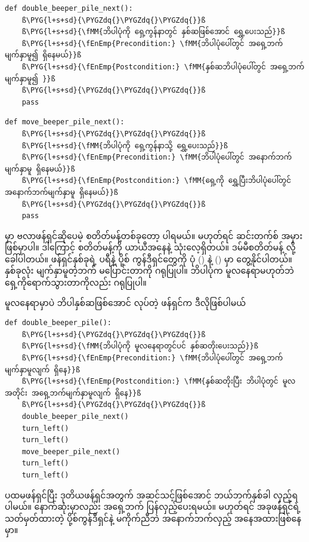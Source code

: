 %
\setlength{\fboxsep}{0pt}
\begin{verbatim}
def double_beeper_pile_next():
    ß\PYG{l+s+sd}{\PYGZdq{}\PYGZdq{}\PYGZdq{}}ß
    ß\PYG{l+s+sd}{\fMM{ဘိပါပုံကို ရှေ့ကွန်နာတွင် နှစ်ဆဖြစ်အောင် ရွှေ့ပေးသည်}}ß
    ß\PYG{l+s+sd}{\fEnEmp{Precondition:} \fMM{ဘိပါပုံပေါ်တွင် အရှေ့ဘက် မျက်နှာမူ၍ ရှိနေမယ်}}ß
    ß\PYG{l+s+sd}{\fEnEmp{Postcondition:} \fMM{နှစ်ဆဘိပါပုံပေါ်တွင် အရှေ့ဘက် မျက်နှာမူ၍ }}ß
    ß\PYG{l+s+sd}{\PYGZdq{}\PYGZdq{}\PYGZdq{}}ß
    pass
\end{verbatim}
%
\betweenminted{\medskipamount}
%
\setlength{\fboxsep}{0pt}
\begin{verbatim}
def move_beeper_pile_next():
    ß\PYG{l+s+sd}{\PYGZdq{}\PYGZdq{}\PYGZdq{}}ß
    ß\PYG{l+s+sd}{\fMM{ဘိပါပုံကို ရှေ့ကွန်နာသို့ ရွှေ့ပေးသည်}}ß
    ß\PYG{l+s+sd}{\fEnEmp{Precondition:} \fMM{ဘိပါပုံပေါ်တွင် အနောက်ဘက်မျက်နှာမူ ရှိနေမယ်}}ß
    ß\PYG{l+s+sd}{\fEnEmp{Postcondition:} \fMM{ရှေ့ကို ရွှေ့ပြီးဘိပါပုံပေါ်တွင် အနောက်ဘက်မျက်နှာမူ ရှိနေမယ်}}ß
    ß\PYG{l+s+sd}{\PYGZdq{}\PYGZdq{}\PYGZdq{}}ß
    pass
\end{verbatim}
%
 မှာ ဗလာဖန်ရှင်ဆိုပေမဲ့ စတိတ်မန့်တစ်ခုတော့ ပါရမယ်။ မဟုတ်ရင် ဆင်းတက်စ် အမှားဖြစ်မှာပါ။ ဒါကြောင့်  စတိတ်မန့်ကို ယာယီအနေနဲ့ သုံးလေ့ရှိတယ်။ ဒမ်မီစတိတ်မန့်   လို့ ခေါ်ပါတယ်။ ဖန်ရှင်နှစ်ခုရဲ့ ပရီနဲ့ ပို့စ် ကွန်ဒီရှင်တွေကို ပုံ (\fRefNo{\ref{fig:dbpnxt12}}) နဲ့ (\fRefNo{\ref{fig:mbpnxt12}}) မှာ တွေ့နိုင်ပါတယ်။ နှစ်ခုလုံး မျက်နှာမူတဲ့ဘက် မပြောင်းတာကို ဂရုပြုပါ။ ဘိပါပုံက မူလနေရာမဟုတ်ဘဲ ရှေ့ကိုရောက်သွားတာကိုလည်း ဂရုပြုပါ။

မူလနေရာမှာပဲ ဘိပါနှစ်ဆဖြစ်အောင် လုပ်တဲ့ ဖန်ရှင်က ဒီလိုဖြစ်ပါမယ်
%
\setlength{\fboxsep}{0pt}
\begin{verbatim}
def double_beeper_pile():
    ß\PYG{l+s+sd}{\PYGZdq{}\PYGZdq{}\PYGZdq{}}ß
    ß\PYG{l+s+sd}{\fMM{ဘိပါပုံကို မူလနေရာတွင်ပင် နှစ်ဆတိုးပေးသည်}}ß
    ß\PYG{l+s+sd}{\fEnEmp{Precondition:} \fMM{ဘိပါပုံပေါ်တွင် အရှေ့ဘက်မျက်နှာမူလျက် ရှိနေ}}ß
    ß\PYG{l+s+sd}{\fEnEmp{Postcondition:} \fMM{နှစ်ဆတိုးပြီး ဘိပါပုံတွင် မူလအတိုင်း အရှေ့ဘက်မျက်နှာမူလျက် ရှိနေ}}ß
    ß\PYG{l+s+sd}{\PYGZdq{}\PYGZdq{}\PYGZdq{}}ß
    double_beeper_pile_next()
    turn_left()
    turn_left()
    move_beeper_pile_next()
    turn_left()
    turn_left()
\end{verbatim}
%
ပထမဖန်ရှင်ပြီး ဒုတိယဖန်ရှင်အတွက် အဆင်သင့်ဖြစ်အောင် ဘယ်ဘက်နှစ်ခါ လှည့်ရပါမယ်။ နောက်ဆုံးမှာလည်း အရှေ့ဘက် ပြန်လှည့်ပေးရမယ်။ မဟုတ်ရင် အခုဖန်ရှင်ရဲ့ သတ်မှတ်ထားတဲ့ ပို့စ်ကွန်ဒီရှင်နဲ့ မကိုက်ညီဘဲ  အနောက်ဘက်လှည့် အနေအထားဖြစ်နေမှာ။

